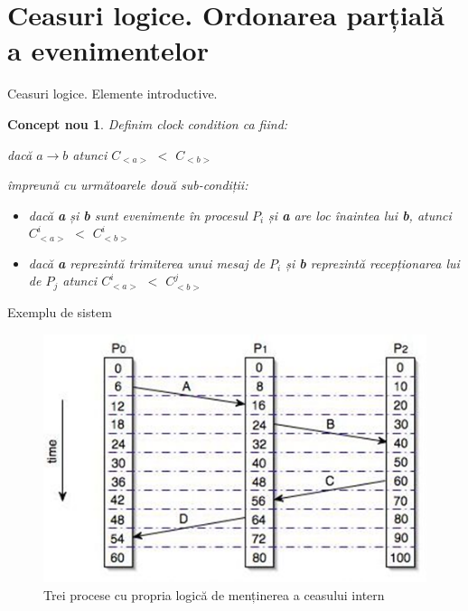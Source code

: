 \documentclass[9pt]{beamer}
\newtheorem{concept}{Concept nou}
\begin{document}
\section[]{Ceasuri logice. Ordonarea parțială a evenimentelor}

\begin{frame}{Ceasuri logice. Elemente introductive.}
\begin{concept}
\Large{Definim clock condition ca fiind:}\\
\begin{center}
dacă $a \rightarrow b$ atunci $C_{<a>}$ $<$
$C_{<b>}$
\end{center}
împreună cu următoarele două sub-condiții:
\begin{itemize}
    \vskip10pt
    \item dacă \textbf{a} și \textbf{b} sunt evenimente în procesul $P_i$ și \textbf{a} are loc înaintea lui \textbf{b}, atunci $C^i_{<a>}$ $<$ $C^i_{<b>}$
	\vskip10pt
	\item dacă \textbf{a} reprezintă trimiterea unui mesaj de $P_i$ și \textbf{b} reprezintă recepționarea lui de $P_j$ atunci $C^i_{<a>}$ $<$ $C^j_{<b>}$
\end{itemize}
\end{concept}
\end{frame}

\begin{frame}{Exemplu de sistem}
\centering
\begin{figure}
    \includegraphics[scale=0.6]{figures/happen2}
    \caption{Trei procese cu propria logică de menținerea a ceasului intern}
\end{figure}
\end{frame}
\end{document}
